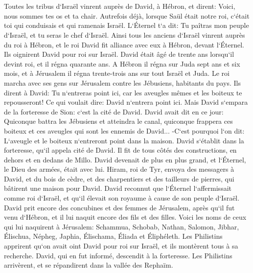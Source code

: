 \chapter{}

\verse Toutes les tribus d`Israël vinrent auprès de David, à Hébron, et dirent: Voici, nous sommes tes os et ta chair. 
\verse Autrefois déjà, lorsque Saül était notre roi, c`était toi qui conduisais et qui ramenais Israël. L`Éternel t`a dit: Tu paîtras mon peuple d`Israël, et tu seras le chef d`Israël. 
\verse Ainsi tous les anciens d`Israël vinrent auprès du roi à Hébron, et le roi David fit alliance avec eux à Hébron, devant l`Éternel. Ils oignirent David pour roi sur Israël. 
\verse David était âgé de trente ans lorsqu`il devint roi, et il régna quarante ans. 
\verse A Hébron il régna sur Juda sept ans et six mois, et à Jérusalem il régna trente-trois ans sur tout Israël et Juda. 
\verse Le roi marcha avec ses gens sur Jérusalem contre les Jébusiens, habitants du pays. Ils dirent à David: Tu n`entreras point ici, car les aveugles mêmes et les boiteux te repousseront! Ce qui voulait dire: David n`entrera point ici. 
\verse Mais David s`empara de la forteresse de Sion: c`est la cité de David. 
\verse David avait dit en ce jour: Quiconque battra les Jébusiens et atteindra le canal, quiconque frappera ces boiteux et ces aveugles qui sont les ennemis de David... -C`est pourquoi l`on dit: L`aveugle et le boiteux n`entreront point dans la maison. 
\verse David s`établit dans la forteresse, qu`il appela cité de David. Il fit de tous côtés des constructions, en dehors et en dedans de Millo. 
\verse David devenait de plus en plus grand, et l`Éternel, le Dieu des armées, était avec lui. 
\verse Hiram, roi de Tyr, envoya des messagers à David, et du bois de cèdre, et des charpentiers et des tailleurs de pierres, qui bâtirent une maison pour David. 
\verse David reconnut que l`Éternel l`affermissait comme roi d`Israël, et qu`il élevait son royaume à cause de son peuple d`Israël. 
\verse David prit encore des concubines et des femmes de Jérusalem, après qu`il fut venu d`Hébron, et il lui naquit encore des fils et des filles. 
\verse Voici les noms de ceux qui lui naquirent à Jérusalem: Schammua, Schobab, Nathan, Salomon, 
\verse Jibhar, Élischua, Népheg, Japhia, 
\verse Élischama, Éliada et Éliphéleth. 
\verse Les Philistins apprirent qu`on avait oint David pour roi sur Israël, et ils montèrent tous à sa recherche. David, qui en fut informé, descendit à la forteresse. 
\verse Les Philistins arrivèrent, et se répandirent dans la vallée des Rephaïm. 
